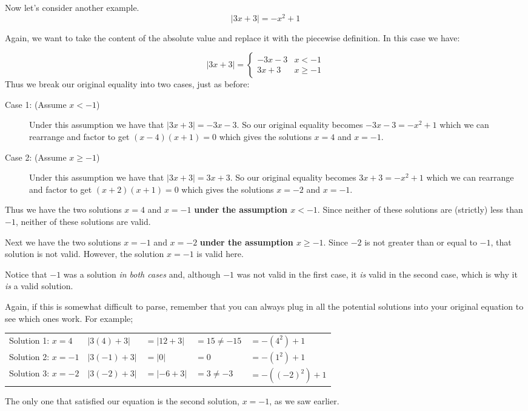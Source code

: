 \documentclass{ximera}
\begin{document}
Now let's consider another example.
\[
    |3x + 3| = -x^2 + 1
\]

Again, we want to take the content of the absolute value and replace it with the piecewise definition. In this case we have:

\[
    |3x+3| = 
        \begin{cases}
            -3x - 3 & x < - 1 \\
            3x + 3 & x \geq - 1
        \end{cases}
\]
Thus we break our original equality into two cases, just as before:

\begin{description}
    \item[Case 1: (Assume $x < -1$)] Under this assumption we have that $|3x + 3| = -3x - 3$. So our original equality becomes $-3x - 3 = -x^2 + 1$ which we can rearrange and factor to get $(x -4)(x + 1) = 0$ which gives the solutions $x = 4$ and $x = -1$. 
    \item[Case 2: (Assume $x \geq -1$)] Under this assumption we have that $|3x + 3| = 3x + 3$. So our original equality becomes $3x + 3 = -x^2 + 1$ which we can rearrange and factor to get $(x + 2)(x + 1) = 0$ which gives the solutions $x = -2$ and $x = -1$.
\end{description}

Thus we have the two solutions $x = 4$ and $x = -1$ \textbf{under the assumption $x < -1$}. Since neither of these solutions are (strictly) less than $-1$, neither of these solutions are valid.

Next we have the two solutions $x = -1$ and $x = -2$ \textbf{under the assumption $x \geq -1$}. Since $-2$ is not greater than or equal to $-1$, that solution is not valid. However, the solution $x = -1$ is valid here.

Notice that $-1$ was a solution \textit{in both cases} and, although $-1$ was not valid in the first case, it \textit{is} valid in the second case, which is why it \textit{is} a valid solution.

Again, if this is somewhat difficult to parse, remember that you can always plug in all the potential solutions into your original equation to see which ones work. For example;

\begin{tabularx}{\textwidth}{lllll}
    Solution 1: $x = 4$     & $|3(4) + 3|$  & $= |12 + 3|$  & $= 15 \neq -15$   & $= -(4^2) + 1$\\
    Solution 2: $x = -1$    & $|3(-1) + 3|$ & $= |0|$       & $= 0 $            & $= -(1^2) + 1$\\
    Solution 3: $x = -2$    & $|3(-2) + 3|$ & $= |-6 + 3|$  & $= 3 \neq -3$     & $= -((-2)^2) + 1$
\end{tabularx}

The only one that satisfied our equation is the second solution, $x = -1$, as we saw earlier.
\end{document}
